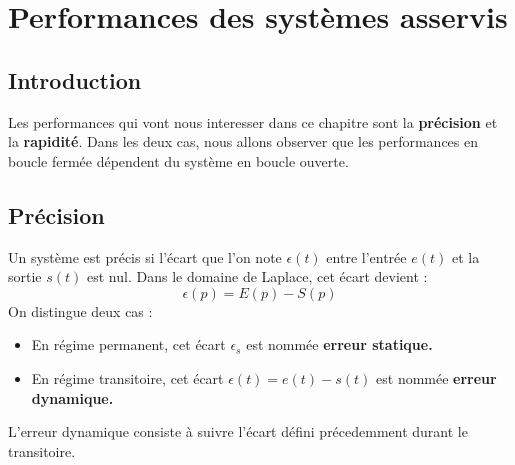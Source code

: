 \chapter[Performances des systèmes]
{Performances des systèmes asservis\label{chap-perf}}
\minitoc
\newpage
\section{Introduction}
Les performances qui vont nous interesser dans 
ce chapitre sont la \textbf{précision} et la \textbf{rapidité}.
Dans les deux cas, nous allons observer que les performances
en boucle fermée dépendent du système en boucle ouverte. 
\section{Précision}
Un système est précis si l'écart que l'on note $\epsilon(t)$ 
entre l'entrée $e(t)$ et la sortie $s(t)$ est nul.
Dans le domaine de Laplace, cet écart devient :
$$
\epsilon(p)=E(p)-S(p)
$$
On distingue deux cas :
\begin{itemize}
    \item En régime permanent, cet écart $\epsilon_s$ est nommée 
		  \textbf{erreur statique. }
    \item En régime transitoire, cet écart $\epsilon(t)=e(t)-s(t)$ est 
		  nommée \textbf{erreur dynamique.}
\end{itemize}
L'erreur dynamique consiste à suivre l'écart défini précedemment durant 
le transitoire.

